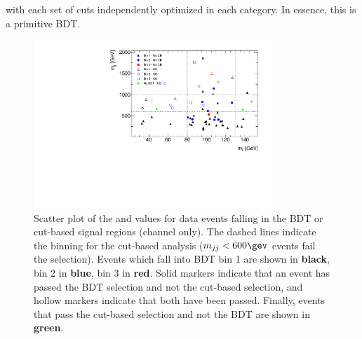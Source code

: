 \noindent
with each set of cuts independently optimized in each category. In essence, this is
a primitive BDT.

\begin{figure}[h]
\centering
\includegraphics[width=0.8\textwidth]{fig/analysis/data_scatter_mjj_mt.pdf}
\caption{Scatter plot of the \mjj and \mT values for data events falling in
the BDT or cut-based signal regions (\emme channel only). The dashed
lines indicate the binning for the cut-based analysis ($\mjj < 600
\gev$ events fail the selection). Events which fall into BDT bin 1 are
shown in {\bf black}, bin 2 in {\bf\color{blue}blue}, bin 3 in
{\bf\color{red}red}. Solid markers indicate that an event has passed
the BDT selection and not the cut-based selection, and hollow markers
indicate that both have been passed. Finally, events that pass the
cut-based selection and not the BDT are shown in {\bf\color{green}green}.}
\label{chap:analysis:fig:scatterplot_mjj_mt}
\end{figure}

